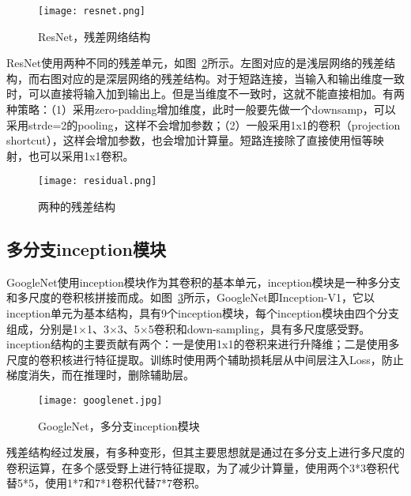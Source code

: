 \begin{figure}[]
    \centering
    \texttt{[image: resnet.png]}	%
    \caption{ResNet，残差网络结构}
    \label{fig:resnet_} %
\end{figure}

ResNet使用两种不同的残差单元，如图~\ref{fig:residual}所示。左图对应的是浅层网络的残差结构，而右图对应的是深层网络的残差结构。对于短路连接，当输入和输出维度一致时，可以直接将输入加到输出上。但是当维度不一致时，这就不能直接相加。有两种策略：（1）采用zero-padding增加维度，此时一般要先做一个downsamp，可以采用strde=2的pooling，这样不会增加参数；（2）一般采用1x1的卷积（projection shortcut），这样会增加参数，也会增加计算量。短路连接除了直接使用恒等映射，也可以采用1x1卷积。

\begin{figure}[]
    \centering
    \texttt{[image: residual.png]}	%
    \caption{两种的残差结构}
    \label{fig:residual} %
\end{figure}


\subsection{多分支inception模块}

GoogleNet使用inception模块作为其卷积的基本单元，inception模块是一种多分支和多尺度的卷积核拼接而成。如图~\ref{fig:googlenet_}所示，GoogleNet即Inception-V1，它以inception单元为基本结构，具有9个inception模块，每个inception模块由四个分支组成，分别是1×1、3×3、5×5卷积和down-sampling，具有多尺度感受野。inception结构的主要贡献有两个：一是使用1x1的卷积来进行升降维；二是使用多尺度的卷积核进行特征提取。训练时使用两个辅助损耗层从中间层注入Loss，防止梯度消失，而在推理时，删除辅助层。

\begin{figure}[]
    \centering
    \texttt{[image: googlenet.jpg]}	%
    \caption{GoogleNet，多分支inception模块}
    \label{fig:googlenet_} %
\end{figure}

残差结构经过发展，有多种变形，但其主要思想就是通过在多分支上进行多尺度的卷积运算，在多个感受野上进行特征提取，为了减少计算量，使用两个3*3卷积代替5*5，使用1*7和7*1卷积代替7*7卷积。

